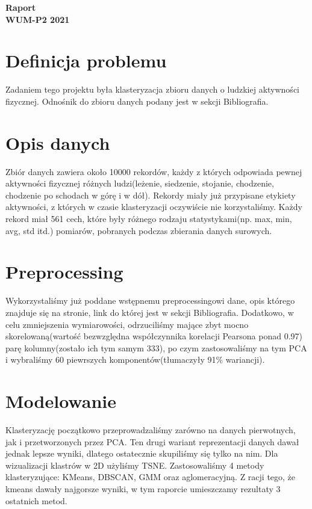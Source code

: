 \documentclass[14pt]{article}
\begin{document}
\noindent
{} \hfill \hfill \llap{\today}

\begin{center}
\Large {\bf Raport} \\
\large \bf WUM-P2 2021
\end{center}

\section*{Definicja problemu}
Zadaniem tego projektu była klasteryzacja zbioru danych o ludzkiej aktywności fizycznej. Odnośnik do zbioru danych podany jest w sekcji Bibliografia.

\section*{Opis danych}
Zbiór danych zawiera około 10000 rekordów, każdy z których odpowiada pewnej aktywności fizycznej różnych ludzi(leżenie, siedzenie, stojanie, chodzenie, chodzenie po schodach w górę i w dół). Rekordy miały już przypisane etykiety aktywności, z których w czasie klasteryzacji oczywiście nie korzystaliśmy. Każdy rekord miał 561 cech, które były różnego rodzaju statystykami(np. max, min, avg, std itd.) pomiarów, pobranych podczas zbierania danych surowych.

\section*{Preprocessing}
Wykorzystaliśmy już poddane wstępnemu preprocessingowi dane, opis którego znajduje się na stronie, link do której jest w sekcji Bibliografia. Dodatkowo, w celu zmniejszenia wymiarowości, odrzuciliśmy mające zbyt mocno skorelowaną(wartość bezwzględna współczynnika korelacji Pearsona ponad 0.97) parę kolumny(zostało ich tym samym 333), po czym zastosowaliśmy na tym PCA i wybraliśmy 60 piewrszych komponentów(tłumaczyły 91\% wariancji).

\section*{Modelowanie}
Klasteryzację początkowo przeprowadzaliśmy zarówno na danych pierwotnych, jak i przetworzonych przez PCA. Ten drugi wariant reprezentacji danych dawał jednak lepsze wyniki, dlatego ostatecznie skupiliśmy się tylko na nim. Dla wizualizacji klastrów w 2D użyliśmy TSNE. Zastosowaliśmy 4 metody klasteryzujące: KMeans, DBSCAN, GMM oraz aglomeracyjną. Z racji tego, że kmeans dawały najgorsze wyniki, w tym raporcie umieszczamy rezultaty 3 ostatnich metod.
\end{document}
